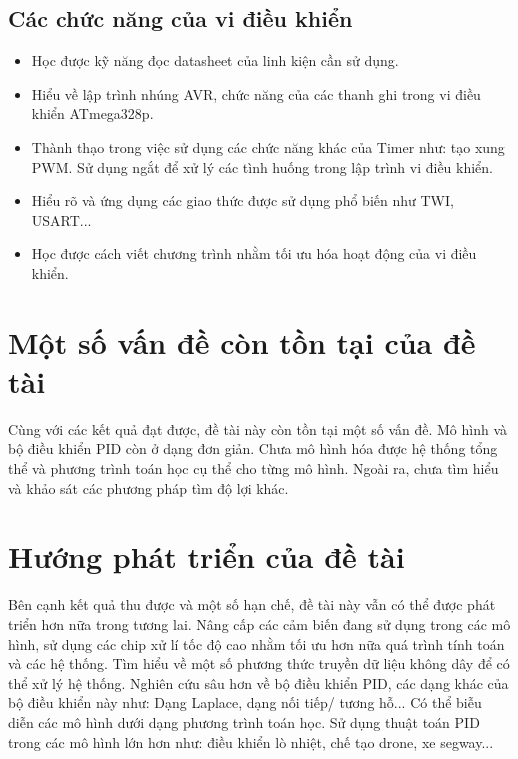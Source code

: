 \subsection{Các chức năng của vi điều khiển}
\begin{itemize}
	\item Học được kỹ năng đọc datasheet của linh kiện cần sử dụng.
	\item Hiểu về lập trình nhúng AVR, chức năng của các thanh ghi trong vi điều khiển ATmega328p.
	\item Thành thạo trong việc sử dụng các chức năng khác của Timer như: tạo xung PWM. Sử dụng ngắt để xử lý các tình huống trong lập trình vi điều khiển.
	\item Hiểu rõ và ứng dụng các giao thức được sử dụng phổ biến như TWI, USART...
	\item Học được cách viết chương trình nhằm tối ưu hóa hoạt động của vi điều khiển.
	  
\end{itemize}
\section{Một số vấn đề còn tồn tại của đề tài}
Cùng với các kết quả đạt được, đề tài này còn tồn tại một số vấn đề. Mô hình và bộ điều khiển PID còn ở dạng đơn giản. Chưa mô hình hóa được hệ thống tổng thể và phương trình toán học cụ thể cho từng mô hình. Ngoài ra, chưa tìm hiểu và khảo sát các phương pháp tìm độ lợi khác.
 
\section{Hướng phát triển của đề tài}
Bên cạnh kết quả thu được và một số hạn chế, đề tài này vẫn có thể được phát triển hơn nữa trong tương lai. Nâng cấp các cảm biến đang sử dụng trong các mô hình, sử dụng các chip xử lí tốc độ cao nhằm tối ưu hơn nữa quá trình tính toán và các hệ thống. Tìm hiểu về một số phương thức truyền dữ liệu không dây để có thể xử lý hệ thống. Nghiên cứu sâu hơn về bộ điều khiển PID, các dạng khác của bộ điều khiển này như: Dạng Laplace, dạng nối tiếp/ tương hỗ... Có thể biễu diễn các mô hình dưới dạng phương trình toán học. Sử dụng thuật toán PID trong các mô hình lớn hơn như: điều khiển lò nhiệt, chế tạo drone, xe segway...


